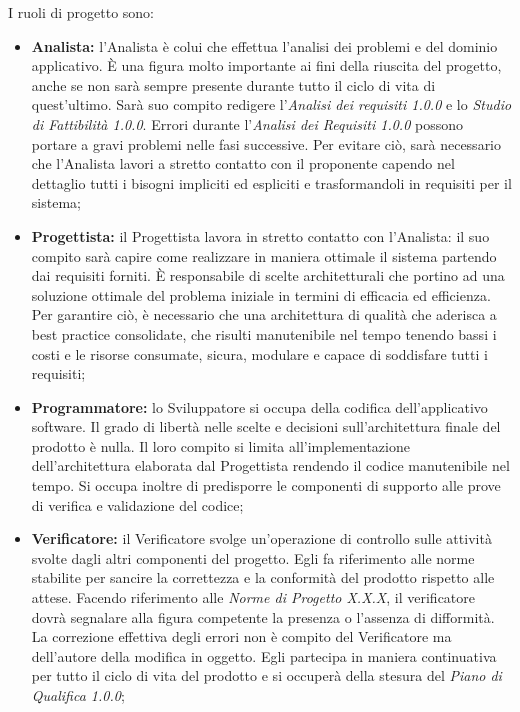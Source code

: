    			\noindent I ruoli di progetto sono:
   			\begin{itemize}
   				\item \textbf{Analista:} l'Analista è colui che effettua l'analisi dei problemi e del dominio applicativo. \`{E} una figura molto importante ai fini della riuscita del progetto, anche se non sarà sempre presente durante tutto il ciclo di vita di quest'ultimo. Sarà suo compito redigere l'\textit{Analisi dei requisiti 1.0.0\doc} e lo \textit{Studio di Fattibilità 1.0.0\doc}. Errori durante l'\textit{Analisi dei Requisiti 1.0.0\doc} possono portare a gravi problemi nelle fasi successive. Per evitare ciò, sarà necessario che l'Analista lavori a stretto contatto con il proponente capendo nel dettaglio tutti i bisogni impliciti ed espliciti e trasformandoli in requisiti per il sistema;
   				\item \textbf{Progettista:} il Progettista lavora in stretto contatto con l'Analista: il suo compito sarà capire come realizzare in maniera ottimale il sistema partendo dai requisiti forniti. È responsabile di scelte architetturali che portino ad una soluzione ottimale del problema iniziale in termini di efficacia ed efficienza. Per garantire ciò, è necessario che una architettura di qualità che aderisca a best practice consolidate, che risulti manutenibile nel tempo tenendo bassi i costi e le risorse consumate, sicura, modulare e capace di soddisfare tutti i requisiti;
   				\item \textbf{Programmatore:} lo Sviluppatore si occupa della codifica dell'applicativo software. Il grado di libertà nelle scelte e decisioni sull'architettura finale del prodotto è nulla. Il loro compito si limita all'implementazione dell'architettura elaborata dal Progettista rendendo il codice manutenibile nel tempo. Si occupa inoltre di predisporre le componenti di supporto alle prove di verifica e validazione del codice;
   				\item \textbf{Verificatore:} il Verificatore svolge un'operazione di controllo sulle attività svolte dagli altri componenti del progetto. Egli fa riferimento alle norme stabilite per sancire la correttezza e la conformità del prodotto rispetto alle attese. Facendo riferimento alle \textit{Norme di Progetto X.X.X\doc}, il verificatore dovrà segnalare alla figura competente la presenza o l'assenza di difformità. La correzione effettiva degli errori non è compito del Verificatore ma dell'autore della modifica in oggetto. Egli partecipa in maniera continuativa per tutto il ciclo di vita del prodotto e si occuperà della stesura del \textit{Piano di Qualifica 1.0.0};

\end{itemize}
